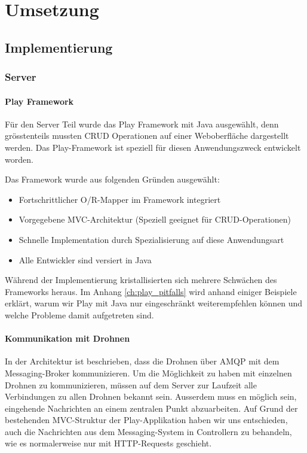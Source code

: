 \newpage
\chapter{Umsetzung}

\section{Implementierung}

\subsection{Server}

\subsubsection{Play Framework}
Für den Server Teil wurde das Play Framework mit Java ausgewählt, denn grösstenteils mussten CRUD Operationen auf einer Weboberfläche dargestellt werden. Das Play-Framework ist speziell für diesen Anwendungszweck entwickelt worden.

Das Framework wurde aus folgenden Gründen ausgewählt:
\begin{itemize}
    \item Fortschrittlicher O/R-Mapper im Framework integriert
    \item Vorgegebene MVC-Architektur (Speziell geeignet für CRUD-Operationen)
    \item Schnelle Implementation durch Spezialisierung auf diese Anwendungsart 
    \item Alle Entwickler sind versiert in Java
\end{itemize}

Während der Implementierung kristallisierten sich mehrere Schwächen des Frameworks heraus. 
Im Anhang \ref{ch:play_pitfalls} wird anhand einiger Beispiele erklärt, warum wir Play mit Java nur eingeschränkt weiterempfehlen können und welche Probleme damit aufgetreten sind.

\subsubsection{Kommunikation mit Drohnen}

In der Architektur ist beschrieben, dass die Drohnen über AMQP mit dem Messaging-Broker kommunizieren. Um die Möglichkeit zu haben mit einzelnen Drohnen zu kommunizieren, müssen auf dem Server zur Laufzeit alle Verbindungen zu allen Drohnen bekannt sein. Ausserdem muss en möglich sein, eingehende Nachrichten an einem zentralen Punkt abzuarbeiten. Auf Grund der bestehenden MVC-Struktur der Play-Applikation haben wir uns entschieden, auch die Nachrichten aus dem Messaging-System in Controllern zu behandeln, wie es normalerweise nur mit HTTP-Requests geschieht.


